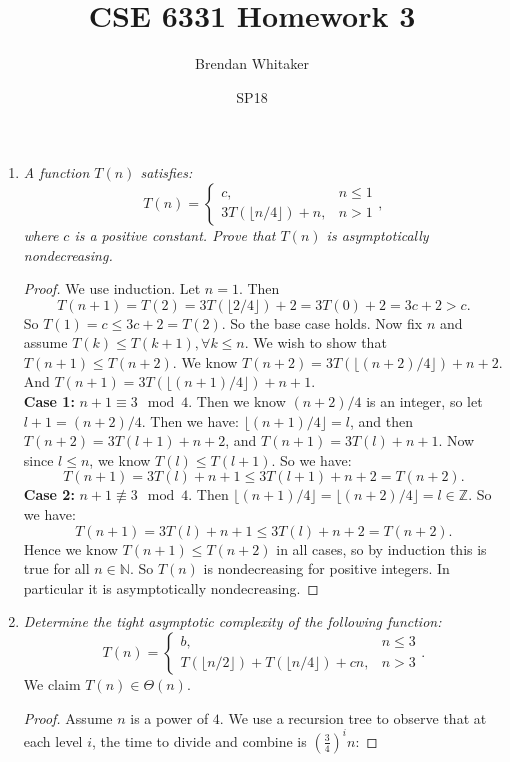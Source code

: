 \documentclass[10pt,oneside,reqno]{amsart}
\theoremstyle{plain}
\theoremstyle{definition}
\newcommand{\z}{\mathbb{Z}}
\newcommand{\n}{\mathbb{N}}
\newcommand{\nequiv}{\not\equiv}
\begin{document}
\title{CSE 6331 Homework 3}

\date{SP18}

\author[Brendan Whitaker]{Brendan Whitaker}

\maketitle

\begin{enumerate}[label=\arabic*.]
\item \textit{A function $T(n)$ satisfies: 
$$
T(n) = 
\begin{cases}
c, &  n \leq 1\\
3T(\lfloor n/4 \rfloor) + n, &  n > 1
\end{cases},
$$
where $c$ is a positive constant. Prove that $T(n)$ is asymptotically nondecreasing. }

\begin{proof}
We use induction. Let $n = 1$. Then 
$$
T(n + 1) = T(2) = 3T(\lfloor 2/4 \rfloor) + 2 = 3T(0) + 2 = 3c + 2 > c.
$$
So $T(1) = c \leq 3c + 2 = T(2)$. So the base case holds. Now fix $n$ and assume $T(k) \leq T(k + 1),\forall k \leq n$. We wish to show that $T(n + 1) \leq T(n + 2)$. We know 
$T(n + 2) = 3T(\lfloor (n + 2)/4 \rfloor) + n + 2$. And $T(n + 1) = 3T(\lfloor (n + 1)/4 \rfloor) + n + 1$. \\
\textbf{Case 1: }$n + 1 \equiv 3 \mod 4$. Then we know $(n + 2)/4$ is an integer, so let $l + 1 = (n + 2)/4$. Then we have: $\lfloor (n + 1)/4 \rfloor = l$, and then $T(n + 2) = 3T(l + 1) + n + 2$, and $T(n + 1) = 3T(l) + n + 1$. Now since $l \leq n$, we know $T(l) \leq T( l + 1)$. So we have: 
$$
T(n + 1) = 3T(l) + n + 1 \leq 3T(l + 1) + n + 2 = T(n  +2).
$$
\textbf{Case 2: }$n + 1 \nequiv 3 \mod 4$. Then $\lfloor (n + 1)/4 \rfloor = \lfloor (n + 2)/4 \rfloor = l \in \z$. So we have: 
$$
T(n + 1) = 3T(l) + n + 1 \leq 3T(l) + n + 2 = T(n  +2).
$$
Hence we know $T(n + 1) \leq T(n + 2)$ in all cases, so by induction this is true for all $n \in \n$. So $T(n)$ is nondecreasing for positive integers. In particular it is asymptotically nondecreasing. 
\end{proof}

\item \textit{Determine the tight asymptotic complexity of the following function:
$$
T(n) = 
\begin{cases}
b, &  n \leq 3\\
T(\lfloor n/2 \rfloor) + T(\lfloor n/4 \rfloor) + cn, &  n > 3
\end{cases}.
$$
}
We claim $T(n) \in \Theta(n)$. 
\begin{proof}
Assume $n$ is a power of $4$. We use a recursion tree to observe that at each level $i$, the time to divide and combine is $(\frac{3}{4})^in$: 



\end{proof}
\end{enumerate}
\end{document}
